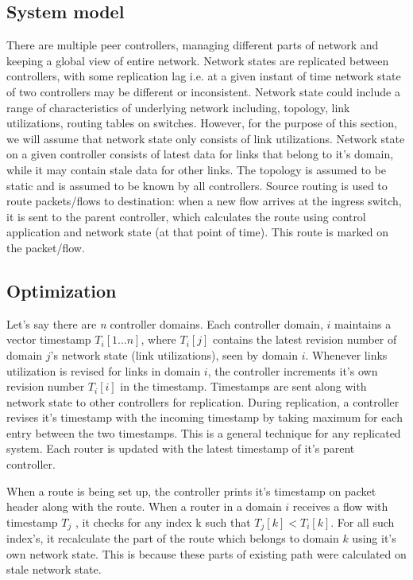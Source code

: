 \documentclass[10pt, twocolumn]{article}
\begin{document}
\subsection{System model}
There are multiple peer controllers, managing different parts of network and keeping a global view of entire network. Network states are replicated between controllers, with some replication lag i.e. at a given instant of time network state of two controllers may be different or inconsistent. Network state could include a range of characteristics of underlying network including, topology, link utilizations, routing tables on switches. However, for the purpose of this section, we will assume that network state only consists of link utilizations. Network state on a given controller consists of latest data for links that belong to it's domain, while it may contain stale data for other links. The topology is assumed to be static and is assumed to be known by all controllers. Source routing is used to route packets/flows to destination: when a new flow arrives at the ingress switch, it is sent to the parent controller, which calculates the route using control application and network state (at that point of time). This route is marked on the packet/flow.
  
\subsection{Optimization}
Let's say there are \emph{n} controller domains. Each controller domain, $i$ maintains a vector timestamp $T_{i}[1...n]$, where $T_{i}[j]$ contains the latest revision number of domain $j$'s network state (link utilizations), seen by domain $i$. Whenever links utilization is revised for links in domain $i$, the controller increments it's own revision number $T_{i}[i]$ in the timestamp. Timestamps are sent along with network state to other controllers for replication. During replication, a controller revises it's timestamp with the incoming timestamp by taking maximum for each entry between the two timestamps. This is a general technique for any replicated system. Each router is updated with the latest timestamp of it's parent controller. 

When a route is being set up, the controller prints it's timestamp on packet header along with the route. When a router in a domain $i$ receives a flow with timestamp $T_{j}$ , it checks for any index k such that $T_{j} [k] < T_{i} [k]$. For all such index's, it recalculate the part of the route which belongs to domain $k$ using it's own network state. This is because these parts of existing path were calculated on stale network state.  
  
\end{document}
